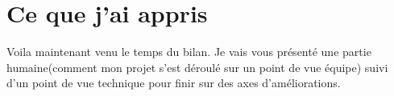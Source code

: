 \chapter{Ce que j'ai appris}

Voila maintenant venu le temps du bilan. Je vais vous présenté une partie humaine(comment mon projet s'est déroulé sur un point de vue équipe) suivi d'un point de vue technique pour finir sur des axes d'améliorations.




